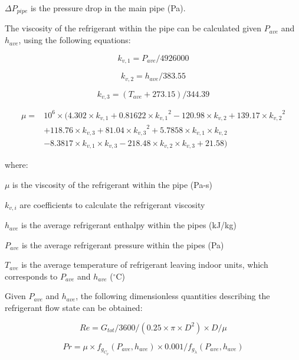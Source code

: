\(\Delta{P_{pipe}}\) is the pressure drop in the main pipe (Pa).

The viscosity of the refrigerant within the pipe can be calculated given \(P_{ave}\) and \(h_{ave}\), using the following equations:

\begin{equation}
k_{v,1} = P_{ave}/4926000
\end{equation}

\begin{equation}
k_{v,2} = h_{ave}/383.55
\end{equation}

\begin{equation}
k_{v,3} = (T_{ave}+273.15)/344.39
\end{equation}

\begin{equation}
\begin{array}{rl}
\mu =& 10^6\times(4.302\times{k_{v,1}}+0.81622\times{k_{v,1}}^2-120.98\times{k_{v,2}}+139.17\times{k_{v,2}}^2 \\
 & +118.76\times{k_{v,3}}+81.04\times{k_{v,3}}^2+5.7858\times{k_{v,1}}\times{k_{v,2}} \\
 & -8.3817\times{k_{v,1}}\times{k_{v,3}}-218.48\times{k_{v,2}}\times{k_{v,3}}+21.58)
\end{array}
\end{equation}

where:

\(\mu\) is the viscosity of the refrigerant within the pipe (Pa-s)

\(k_{v,i}\) are coefficients to calculate the refrigerant viscosity

\(h_{ave}\) is the average refrigerant enthalpy within the pipes (kJ/kg)

\(P_{ave}\) is the average refrigerant pressure within the pipes (Pa)

\(T_{ave}\) is the average temperature of refrigerant leaving indoor units, which corresponds to \(P_{ave}\) and \(h_{ave}\) (\(^{\circ}\)C)

Given \(P_{ave}\) and \(h_{ave}\), the following dimensionless quantities describing the refrigerant flow state can be obtained:

\begin{equation}
Re = G_{tot}/3600/(0.25\times\pi\times{D^2})\times{D}/\mu
\end{equation}

\begin{equation}
Pr = \mu\times{f_{g_{C_p}}(P_{ave},h_{ave})}\times{0.001}/f_{g_\lambda}(P_{ave},h_{ave})
\end{equation}

